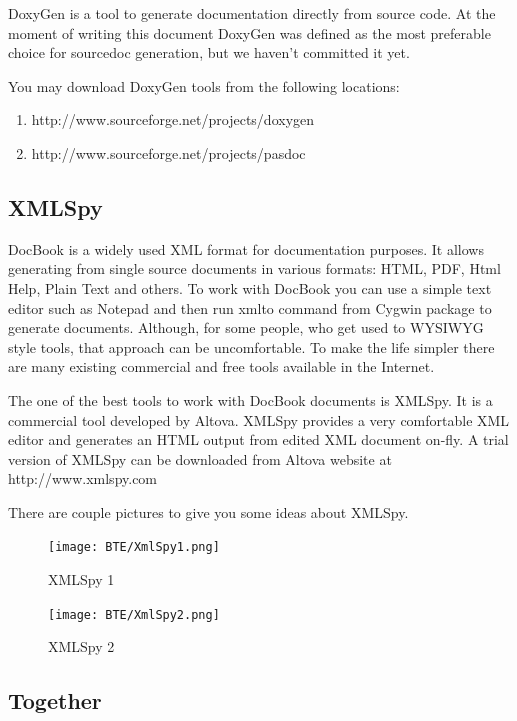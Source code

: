 \documentclass[a4paper,12pt,oneside]{book}
\begin{document}
DoxyGen is a tool to generate documentation directly from source code.
At the moment of writing this document DoxyGen was defined as the most preferable choice for sourcedoc generation, but we haven’t committed it yet.

You may download DoxyGen tools from the following locations:
\begin{enumerate}
  \item http://www.sourceforge.net/projects/doxygen
	\item http://www.sourceforge.net/projects/pasdoc
\end{enumerate}

\subsection{XMLSpy}

DocBook is a widely used XML format for documentation purposes.
It allows generating from single source documents in various formats: HTML, PDF, Html Help, Plain Text and others.
To work with DocBook you can use a simple text editor such as Notepad and then run xmlto command from Cygwin package to generate documents.
Although, for some people, who get used to WYSIWYG style tools, that approach can be uncomfortable.
To make the life simpler there are many existing commercial and free tools available in the Internet. 

The one of the best tools to work with DocBook documents is XMLSpy.
It is a commercial tool developed by Altova.
XMLSpy provides a very comfortable XML editor and generates an HTML output from edited XML document on-fly.
A trial version of XMLSpy can be downloaded from Altova website at http://www.xmlspy.com

There are couple pictures to give you some ideas about XMLSpy.

\begin{figure}[htbp] 
  \centering
  \texttt{[image: BTE/XmlSpy1.png]}
  \caption{XMLSpy 1}
  \label{fig:XmlSpy1}
\end{figure}

\begin{figure}[htbp] 
  \centering
  \texttt{[image: BTE/XmlSpy2.png]}
  \caption{XMLSpy 2}
  \label{fig:XmlSpy2}
\end{figure}
				
\subsection{Together}
\end{document}
